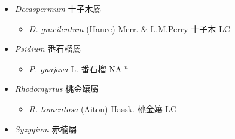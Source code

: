 
  \begin{itemize}
 \item[] \textit{Decaspermum} 十子木屬
                    
  \begin{itemize}
        \item[] \href{http://www.theplantlist.org/tpl1.1/search?q=Decaspermum+gracilentum}{\textit{D. gracilentum} (Hance) Merr. \& L.M.Perry}   十子木 LC
  \end{itemize}
 \item[] \textit{Psidium} 番石榴屬
                    
  \begin{itemize}
        \item[] \href{http://www.theplantlist.org/tpl1.1/search?q=Psidium+guajava}{\textit{P. guajava} L.}   番石榴 NA $^n$
  \end{itemize}
 \item[] \textit{Rhodomyrtus} 桃金孃屬
                    
  \begin{itemize}
        \item[] \href{http://www.theplantlist.org/tpl1.1/search?q=Rhodomyrtus+tomentosa}{\textit{R. tomentosa} (Aiton) Hassk.}   桃金孃 LC
  \end{itemize}
 \item[] \textit{Syzygium} 赤楠屬
                    

\end{itemize}
